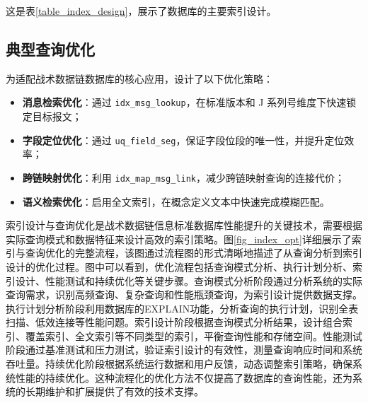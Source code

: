 这是表\ref{table_index_design}，展示了数据库的主要索引设计。

\begin{table}[!htb]
    \caption{主要索引设计示例}
    \label{table_index_design}
    \centering
\end{table}

\subsection{典型查询优化}
为适配战术数据链数据库的核心应用，设计了以下优化策略：
\begin{itemize}
  \item \textbf{消息检索优化}：通过 \texttt{idx\_msg\_lookup}，在标准版本和 J 系列号维度下快速锁定目标报文；
  \item \textbf{字段定位优化}：通过 \texttt{uq\_field\_seg}，保证字段位段的唯一性，并提升定位效率；
  \item \textbf{跨链映射优化}：利用 \texttt{idx\_map\_msg\_link}，减少跨链映射查询的连接代价；
  \item \textbf{语义检索优化}：启用全文索引，在概念定义文本中快速完成模糊匹配。
\end{itemize}
索引设计与查询优化是战术数据链信息标准数据库性能提升的关键技术，需要根据实际查询模式和数据特征来设计高效的索引策略。图\ref{fig_index_opt}详细展示了索引与查询优化的完整流程，该图通过流程图的形式清晰地描述了从查询分析到索引设计的优化过程。图中可以看到，优化流程包括查询模式分析、执行计划分析、索引设计、性能测试和持续优化等关键步骤。查询模式分析阶段通过分析系统的实际查询需求，识别高频查询、复杂查询和性能瓶颈查询，为索引设计提供数据支撑。执行计划分析阶段利用数据库的EXPLAIN功能，分析查询的执行计划，识别全表扫描、低效连接等性能问题。索引设计阶段根据查询模式分析结果，设计组合索引、覆盖索引、全文索引等不同类型的索引，平衡查询性能和存储空间。性能测试阶段通过基准测试和压力测试，验证索引设计的有效性，测量查询响应时间和系统吞吐量。持续优化阶段根据系统运行数据和用户反馈，动态调整索引策略，确保系统性能的持续优化。这种流程化的优化方法不仅提高了数据库的查询性能，还为系统的长期维护和扩展提供了有效的技术支撑。

